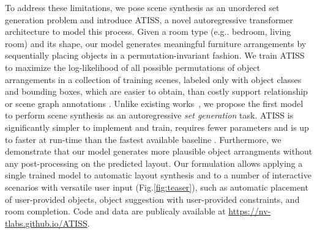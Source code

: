 \documentclass{article}
\makeatletter
\DeclareRobustCommand\onedot{\futurelet\@let@token\@onedot}
\def\@onedot{\ifx\@let@token.\else.\null\fi\xspace}
\def\eg{e.g\onedot} \def\Eg{E.g\onedot}
\def\ie{i.e\onedot} \def\Ie{I.e\onedot}
\def\etal{et~al\onedot}
\makeatother
\begin{document}
\iffalse
Another line of research utilizes CNN-based architectures to generate rooms by autoregressively
selecting and placing objects in a scene \ie one after
the other~\cite{Wang2018SIGGRAPH, Ritchie2019CVPR}.
In concurrent work, Wang \etal~\cite{Wang2020ARXIV} proposed a
transformer-based architecture to perform this task.  These approaches
represent scenes as ordered sequences of objects. Typically, the ordering is
defined using the spatial arrangement of objects in a room (\eg bottom-to-top
and left-to-right) \cite{Jyothi2019ICCV} or the object class frequency (\eg
most probable to least probable object class) \cite{Ritchie2019CVPR,
Wang2020ARXIV}. However, this representation is unnatural and imposes
constraints on the scene generation process, since adding an object should
follow a specific ordering.  In particular for
\cite{Ritchie2019CVPR, Wang2020ARXIV}, the probability that a bed appears after
an ottoman in the training set is zero, because beds are more frequent objects
than ottomans and objects are ordered based on their class frequency. As a
result, \cite{Ritchie2019CVPR, Wang2020ARXIV} cannot generate more
common objects (\eg beds) after less common objects (\eg otommon). This
significantly limits their application on various tasks such as partial room
re-arrangement with any number of object classes or positions, or suggesting
objects given any partially completed room.various interactive applications. 
\fi

To address these limitations, we pose scene synthesis as an unordered set
generation problem and introduce ATISS, a novel autoregressive transformer architecture to
model this process. Given a room type (\eg bedroom, living room) and its shape, our
model generates meaningful furniture arrangements by sequentially
placing objects in a permutation-invariant fashion. We train ATISS
to maximize the log-likelihood of all possible permutations of object
arrangements in a collection of training scenes, labeled only with object
classes and  bounding boxes, which are easier to obtain, than costly
support relationship \cite{Wang2019SIGGRAPH} or scene graph annotations \cite{Li2019SIGGRAPH}. Unlike
existing works~\cite{Wang2018SIGGRAPH, Ritchie2019CVPR, Wang2020ARXIV},
we propose the first model to perform scene synthesis as an autoregressive \emph{set generation} task.
ATISS is significantly simpler to implement and train, requires
fewer parameters and is up to  faster at run-time than the fastest available baseline
\cite{Wang2020ARXIV}. Furthermore, we
demonstrate that our model generates more plausible object arrangments
without any post-processing on the
predicted layout. Our  formulation allows applying a single trained model to
automatic layout synthesis and to a number of interactive scenarios with
versatile user input (Fig.\ref{fig:teaser}), such as automatic placement of
user-provided objects, object suggestion with user-provided constraints, and room completion.
Code and data are publicaly available at \url{https://nv-tlabs.github.io/ATISS}.
\end{document}
